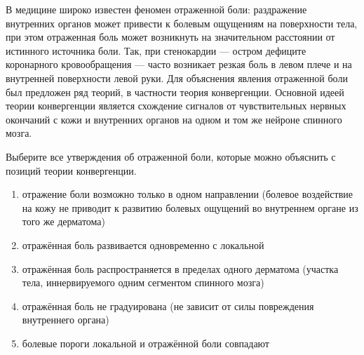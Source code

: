 
В медицине широко известен феномен отраженной боли:
раздражение внутренних органов может привести к болевым ощущениям на
поверхности тела, при этом отраженная боль может возникнуть на значительном
расстоянии от истинного источника боли. Так, при стенокардии — остром дефиците
коронарного кровообращения — часто возникает резкая боль в левом плече и на
внутренней поверхности левой руки. Для объяснения явления отраженной боли был
предложен ряд теорий, в частности теория конвергенции. Основной идеей теории
конвергенции является схождение сигналов от чувствительных нервных окончаний с
кожи и внутренних органов на одном и том же нейроне спинного мозга.

Выберите все утверждения об отраженной боли,
которые можно объяснить с позиций теории конвергенции.

\begin{enumerate}
    \item отражение боли возможно только в одном направлении (болевое воздействие на кожу не приводит к развитию болевых ощущений во внутреннем органе из того же дерматома)
    \item отражённая боль развивается одновременно с локальной
    \item отражённая боль распространяется в пределах одного дерматома (участка тела, иннервируемого одним сегментом спинного мозга)
    \item отражённая боль не градуирована (не зависит от силы повреждения внутреннего органа)
    \item болевые пороги локальной и отражённой боли совпадают
\end{enumerate}

\explanationSection

